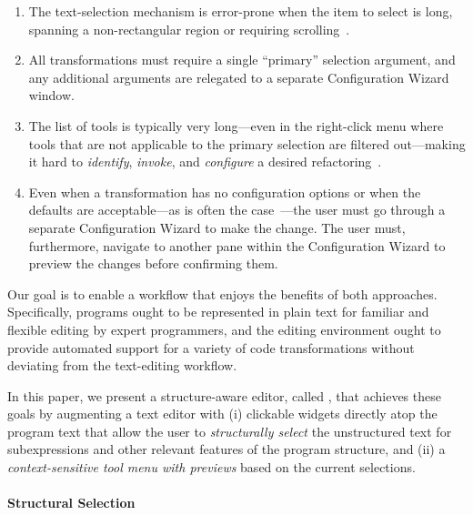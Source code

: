 \begin{enumerate}

\item The text-selection mechanism is error-prone when the item to select is
long, spanning a non-rectangular region or requiring
scrolling~\citep{Murphy-Hill-ICSE2008}.

\item All transformations must require a single ``primary'' selection argument,
and any additional arguments are relegated to a separate Configuration Wizard
window.

\item The list of tools is typically very long---even in the right-click menu
where tools that are not applicable to the primary selection are filtered
out---making it hard to \emph{identify}, \emph{invoke}, and \emph{configure} a
desired refactoring~\citep{Murphy-Hill:2009,Vakilian:2012,Mealy:2007}.

\item Even when a transformation has no configuration options or when the
defaults are acceptable---as is often the case~\citep{Murphy-Hill:2009}---the
user must go through a separate Configuration Wizard to make the change. The
user must, furthermore, navigate to another pane within the Configuration Wizard
to preview the changes before confirming them.

\end{enumerate}


Our goal is to enable a workflow that enjoys the benefits
of both approaches. Specifically, programs ought to be represented in
plain text for familiar and flexible editing by expert programmers,
and the editing environment ought to provide automated support for a
variety of code transformations without deviating
from the text-editing workflow.

In this paper, we present a structure-aware editor, called \deuce{}, that
achieves these goals by augmenting a text editor with (i) clickable
widgets directly atop the program text that allow the user to \emph{structurally
select} the unstructured text for subexpressions and other relevant features of
the program structure, and (ii) a \emph{context-sensitive tool menu with
previews} based on the current selections.

\paragraph{Structural \maybeCode{} Selection}

